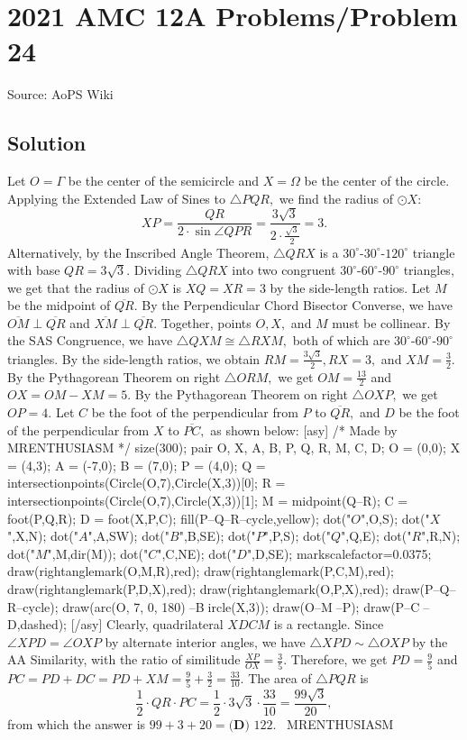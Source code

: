 \documentclass[12pt]{article}
\begin{document}
\section*{{2021 AMC 12A Problems/Problem 24}}
Source: AoPS Wiki

\subsection*{Solution}
Let $O=\Gamma$ be the center of the semicircle and $X=\Omega$ be the center of the circle. Applying the Extended Law of Sines to $\triangle PQR,$ we find the radius of $\odot X:$ \[XP=\frac{QR}{2\cdot\sin \angle QPR}=\frac{3\sqrt3}{2\cdot\frac{\sqrt3}{2}}=3.\] Alternatively, by the Inscribed Angle Theorem, $\triangle QRX$ is a $30^\circ\text{-}30^\circ\text{-}120^\circ$ triangle with base $QR=3\sqrt3.$ Dividing $\triangle QRX$ into two congruent $30^\circ\text{-}60^\circ\text{-}90^\circ$ triangles, we get that the radius of $\odot X$ is $XQ=XR=3$ by the side-length ratios. Let $M$ be the midpoint of $\overline{QR}.$ By the Perpendicular Chord Bisector Converse, we have $\overline{OM}\perp\overline{QR}$ and $\overline{XM}\perp\overline{QR}.$ Together, points $O, X,$ and $M$ must be collinear. By the SAS Congruence, we have $\triangle QXM\cong\triangle RXM,$ both of which are $30^\circ\text{-}60^\circ\text{-}90^\circ$ triangles. By the side-length ratios, we obtain $RM=\frac{3\sqrt3}{2}, RX=3,$ and $XM=\frac{3}{2}.$ By the Pythagorean Theorem on right $\triangle ORM,$ we get $OM=\frac{13}{2}$ and $OX=OM-XM=5.$ By the Pythagorean Theorem on right $\triangle OXP,$ we get $OP=4.$ Let $C$ be the foot of the perpendicular from $P$ to $\overline{QR},$ and $D$ be the foot of the perpendicular from $X$ to $\overline{PC},$ as shown below: [asy] /* Made by MRENTHUSIASM */ size(300); pair O, X, A, B, P, Q, R, M, C, D; O = (0,0); X = (4,3); A = (-7,0); B = (7,0); P = (4,0); Q = intersectionpoints(Circle(O,7),Circle(X,3))[0]; R = intersectionpoints(Circle(O,7),Circle(X,3))[1]; M = midpoint(Q--R); C = foot(P,Q,R); D = foot(X,P,C); fill(P--Q--R--cycle,yellow); dot("$O$",O,S); dot("$X$",X,N); dot("$A$",A,SW); dot("$B$",B,SE); dot("$P$",P,S); dot("$Q$",Q,E); dot("$R$",R,N); dot("$M$",M,dir(M)); dot("$C$",C,NE); dot("$D$",D,SE); markscalefactor=0.0375; draw(rightanglemark(O,M,R),red); draw(rightanglemark(P,C,M),red); draw(rightanglemark(P,D,X),red); draw(rightanglemark(O,P,X),red); draw(P--Q--R--cycle); draw(arc(O, 7, 0, 180)^^A--B^^Circle(X,3)); draw(O--M^^X--P); draw(P--C^^X--D,dashed); [/asy] Clearly, quadrilateral $XDCM$ is a rectangle. Since $\angle XPD=\angle OXP$ by alternate interior angles, we have $\triangle XPD\sim\triangle OXP$ by the AA Similarity, with the ratio of similitude $\frac{XP}{OX}=\frac 35.$ Therefore, we get $PD=\frac 95$ and $PC=PD+DC=PD+XM=\frac 95 + \frac 32 = \frac{33}{10}.$ The area of $\triangle PQR$ is \[\frac12\cdot QR\cdot PC=\frac12\cdot3\sqrt3\cdot\frac{33}{10}=\frac{99\sqrt3}{20},\] from which the answer is $99+3+20=\boxed{\textbf{(D) } 122}.$ ~MRENTHUSIASM
\end{document}
